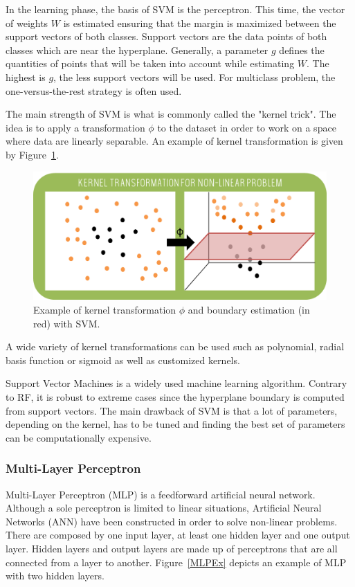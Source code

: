 \documentclass[a4paper,10pt]{article}
\begin{document}
In the learning phase, the basis of SVM is the perceptron. This time, the vector of weights $W$ is estimated ensuring that the margin is maximized between the support vectors of both classes. Support vectors are the data points of both classes which are near the hyperplane. Generally, a parameter $g$ defines the quantities of points that will be taken into account while estimating $W$. The highest is $g$, the less support vectors will be used.
For multiclass problem, the one-versus-the-rest strategy is often used.

The main strength of SVM is what is commonly called the "kernel trick". The idea is to apply a transformation $\phi$ to the dataset in order to work on a space where data are linearly separable. An example of kernel transformation is given by Figure~\ref{KernelEx}.

\begin{figure}[htbp]
\centerline{\includegraphics[width=0.75\linewidth]{./figures/KernelTrick.png}}
\caption{Example of kernel transformation $\phi$ and boundary estimation (in red) with SVM.}
\label{KernelEx}
\end{figure}

A wide variety of kernel transformations can be used such as polynomial, radial basis function or sigmoid as well as customized kernels.

Support Vector Machines is a widely used machine learning algorithm. Contrary to RF, it is robust to extreme cases since the hyperplane boundary is computed from support vectors. The main drawback of SVM is that a lot of parameters, depending on the kernel, has to be tuned and finding the best set of parameters can be computationally expensive.

\subsubsection{Multi-Layer Perceptron}

Multi-Layer Perceptron (MLP) is a feedforward artificial neural network. Although a sole perceptron is limited to linear situations, Artificial Neural Networks (ANN) have been constructed in order to solve non-linear problems. There are composed by one input layer, at least one hidden layer and one output layer. Hidden layers and output layers are made up of perceptrons that are all connected from a layer to another. Figure~\ref{MLPEx} depicts an example of MLP with two hidden layers.
\end{document}
